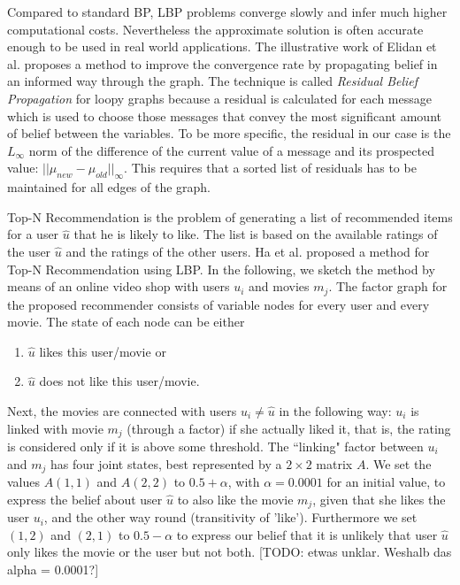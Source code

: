 Compared to standard BP, LBP problems converge slowly and infer much higher computational costs. Nevertheless the approximate solution is often accurate enough to be used in real world applications. The illustrative work of Elidan et al. \cite{elidan2012residual} proposes a method to improve the convergence rate by propagating belief in an informed way through the graph. The technique is called \textit{Residual Belief Propagation} for loopy graphs because a residual is calculated for each message which is used to choose those messages that convey the most significant amount of belief between the variables. To be more specific, the residual in our case is the $L_\infty$ norm of the difference of the current value of a message and its prospected value: $||\mu_{new} - \mu_{old}||_\infty$. This requires that a sorted list of residuals has to be maintained for all edges of the graph.


Top-N Recommendation is the problem of generating a list of recommended items for a user $\hat u$ that he is likely to like. The list is based on the available ratings of the user $\hat u$ and the ratings of the other users. Ha et al. \cite{Ha:2012:TRT:2396761.2398636} proposed a method for Top-N Recommendation using LBP. In the following, we sketch the method by means of an online video shop with users $u_i$ and movies $m_j$. The factor graph for the proposed recommender consists of variable nodes for every user and every movie. The state of each node can be either
\begin{enumerate}
   \itemsep0em 
   \item $\hat u$ likes this user/movie or
   \item $\hat u$ does not like this user/movie.
\end{enumerate}
Next, the movies are connected with users $u_i\neq \hat u$ in the following way: $u_i$ is linked with movie $m_j$ (through a factor) if she actually liked it, that is, the rating is considered only if it is above some threshold. The ``linking" factor between $u_i$ and $m_j$ has four joint states, best represented by a $2\times 2$ matrix $A$. We set the values $A(1,1)$ and $A(2,2)$ to $0.5 + \alpha$, with $\alpha = 0.0001$ for an initial value, to express the belief about user $\hat u$ to also like the movie $m_j$, given that she likes the user $u_i$, and the other way round (transitivity of 'like'). Furthermore we set $(1,2)$ and $(2,1)$ to $0.5 - \alpha$ to express our belief that it is unlikely that user $\hat u$ only likes the movie or the user but not both. [TODO: etwas unklar. Weshalb das alpha = 0.0001?]

